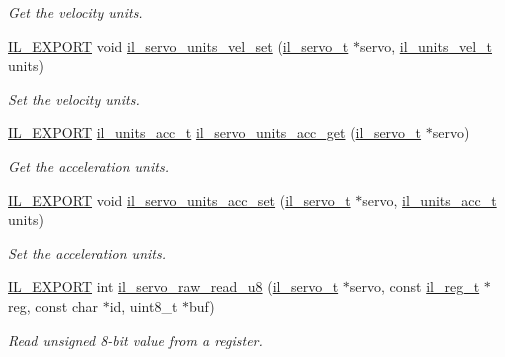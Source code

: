 \begin{DoxyCompactItemize}
\begin{DoxyCompactList}\small\item\em Get the velocity units. \end{DoxyCompactList}\item 
\hyperlink{common_8h_a6bb629d26c52bfe10519ba3176853f47}{I\+L\+\_\+\+E\+X\+P\+O\+RT} void \hyperlink{group__IL__SERVO_gacd15dfc7141865bcb63912888aad71ba}{il\+\_\+servo\+\_\+units\+\_\+vel\+\_\+set} (\hyperlink{group__IL__SERVO_ga3369ddfcc33492fe3a28f96cf455b13e}{il\+\_\+servo\+\_\+t} $\ast$servo, \hyperlink{group__IL__SERVO_ga548eebb728eb841e157b57f2063203ee}{il\+\_\+units\+\_\+vel\+\_\+t} units)
\begin{DoxyCompactList}\small\item\em Set the velocity units. \end{DoxyCompactList}\item 
\hyperlink{common_8h_a6bb629d26c52bfe10519ba3176853f47}{I\+L\+\_\+\+E\+X\+P\+O\+RT} \hyperlink{group__IL__SERVO_ga07f4e0f292d1d7b5a6f1fc5c35fc151f}{il\+\_\+units\+\_\+acc\+\_\+t} \hyperlink{group__IL__SERVO_ga312b0ca5ea200c5ec1c60adad84017a2}{il\+\_\+servo\+\_\+units\+\_\+acc\+\_\+get} (\hyperlink{group__IL__SERVO_ga3369ddfcc33492fe3a28f96cf455b13e}{il\+\_\+servo\+\_\+t} $\ast$servo)
\begin{DoxyCompactList}\small\item\em Get the acceleration units. \end{DoxyCompactList}\item 
\hyperlink{common_8h_a6bb629d26c52bfe10519ba3176853f47}{I\+L\+\_\+\+E\+X\+P\+O\+RT} void \hyperlink{group__IL__SERVO_gae06520e0e95dc18d1586c6b76d303b80}{il\+\_\+servo\+\_\+units\+\_\+acc\+\_\+set} (\hyperlink{group__IL__SERVO_ga3369ddfcc33492fe3a28f96cf455b13e}{il\+\_\+servo\+\_\+t} $\ast$servo, \hyperlink{group__IL__SERVO_ga07f4e0f292d1d7b5a6f1fc5c35fc151f}{il\+\_\+units\+\_\+acc\+\_\+t} units)
\begin{DoxyCompactList}\small\item\em Set the acceleration units. \end{DoxyCompactList}\item 
\hyperlink{common_8h_a6bb629d26c52bfe10519ba3176853f47}{I\+L\+\_\+\+E\+X\+P\+O\+RT} int \hyperlink{group__IL__SERVO_ga8b1bd006fa9cd70b20097f723891122b}{il\+\_\+servo\+\_\+raw\+\_\+read\+\_\+u8} (\hyperlink{group__IL__SERVO_ga3369ddfcc33492fe3a28f96cf455b13e}{il\+\_\+servo\+\_\+t} $\ast$servo, const \hyperlink{structil__reg__t}{il\+\_\+reg\+\_\+t} $\ast$reg, const char $\ast$id, uint8\+\_\+t $\ast$buf)
\begin{DoxyCompactList}\small\item\em Read unsigned 8-\/bit value from a register. \end{DoxyCompactList}\item 

\end{DoxyCompactItemize}
